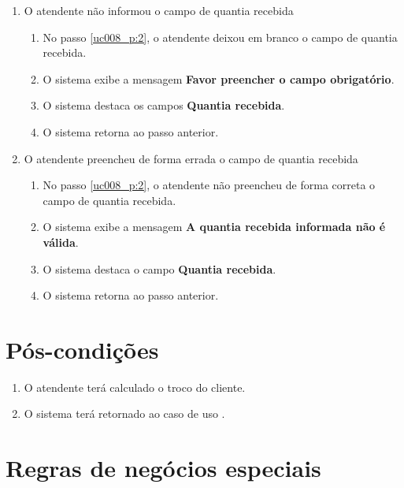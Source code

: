 \begin{enumerate}[label=E\arabic*]
	\item O atendente não informou o campo de quantia recebida \label{uc008_e:1}
	\begin{enumerate}[label*=.\arabic*]
		\item[] No passo \ref{uc008_p:2}, o atendente deixou em branco o campo de quantia recebida.
		\item O sistema exibe a mensagem \textbf{Favor preencher o campo obrigatório}.
		\item O sistema destaca os campos \textbf{Quantia recebida}.
		\item O sistema retorna ao passo anterior.
	\end{enumerate}
	
	\item O atendente preencheu de forma errada o campo de quantia recebida \label{uc008_e:2}
	\begin{enumerate}[label*=.\arabic*]		
		\item[] No passo \ref{uc008_p:2}, o atendente não preencheu de forma correta o campo de quantia recebida.		
		\item O sistema exibe a mensagem \textbf{A quantia recebida informada não é válida}.
		\item O sistema destaca o campo \textbf{Quantia recebida}.
		\item O sistema retorna ao passo anterior.
	\end{enumerate}
\end{enumerate}

\section{Pós-condições}

\begin{enumerate}
	\item O atendente terá calculado o troco do cliente.
	\item O sistema terá retornado ao caso de uso .	
\end{enumerate}

\section{Regras de negócios especiais}

